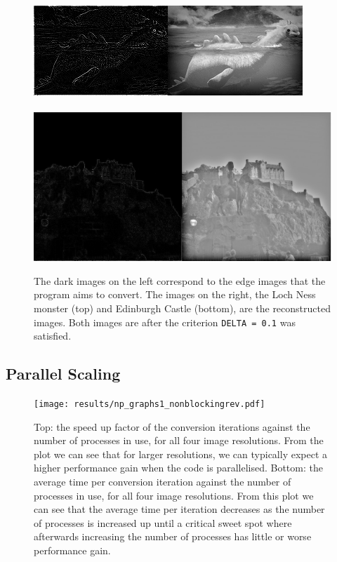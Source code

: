 \documentclass[11pt, a4paper]{article}
\begin{document}
					
			\begin{figure}
				\centering
				\includegraphics[scale=0.81]{image1.png}
				~\\~\\
				\includegraphics[scale=0.20]{image4.png}
				\caption{The dark images on the left correspond to the edge images that the program aims to convert. The images on the right, the Loch Ness monster (top) and Edinburgh Castle (bottom), are the reconstructed images. Both images are after the criterion \texttt{DELTA = 0.1} was satisfied.}
				\label{fig:before_after_images}
			\end{figure}

		\subsection{Parallel Scaling}	
			\begin{figure}
				\centering
				\texttt{[image: results/np\_graphs1\_nonblockingrev.pdf]}
				\caption{Top: the speed up factor of the conversion iterations against the number of processes in use, for all four image resolutions. From the plot we can see that for larger resolutions, we can typically expect a higher performance gain when the code is parallelised. Bottom: the average time per conversion iteration against the number of processes in use, for all four image resolutions. From this plot we can see that the average time per iteration decreases as the number of processes is increased up until a critical sweet spot where afterwards increasing the number of processes has little or worse performance gain.}
				\label{fig:np_runtime1}
			\end{figure}
\end{document}
